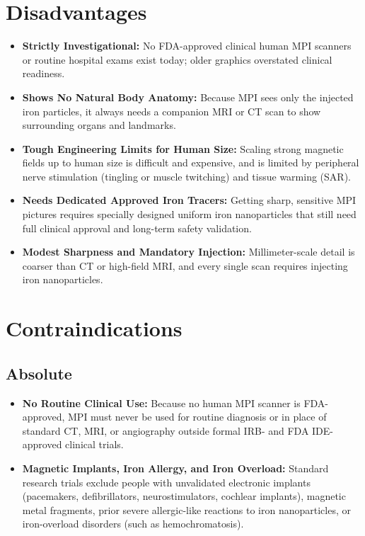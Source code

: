 \section{Disadvantages}
\begin{itemize}
  \item \textbf{Strictly Investigational:} No FDA-approved clinical human MPI scanners or routine hospital exams exist today; older graphics overstated clinical readiness.
  \item \textbf{Shows No Natural Body Anatomy:} Because MPI sees only the injected iron particles, it always needs a companion MRI or CT scan to show surrounding organs and landmarks.
  \item \textbf{Tough Engineering Limits for Human Size:} Scaling strong magnetic fields up to human size is difficult and expensive, and is limited by peripheral nerve stimulation (tingling or muscle twitching) and tissue warming (SAR).
  \item \textbf{Needs Dedicated Approved Iron Tracers:} Getting sharp, sensitive MPI pictures requires specially designed uniform iron nanoparticles that still need full clinical approval and long-term safety validation.
  \item \textbf{Modest Sharpness and Mandatory Injection:} Millimeter-scale detail is coarser than CT or high-field MRI, and every single scan requires injecting iron nanoparticles.
\end{itemize}

\section{Contraindications}

\subsection{Absolute}
\begin{itemize}
  \item \textbf{No Routine Clinical Use:} Because no human MPI scanner is FDA-approved, MPI must never be used for routine diagnosis or in place of standard CT, MRI, or angiography outside formal IRB- and FDA IDE-approved clinical trials.
  \item \textbf{Magnetic Implants, Iron Allergy, and Iron Overload:} Standard research trials exclude people with unvalidated electronic implants (pacemakers, defibrillators, neurostimulators, cochlear implants), magnetic metal fragments, prior severe allergic-like reactions to iron nanoparticles, or iron-overload disorders (such as hemochromatosis).
\end{itemize}

